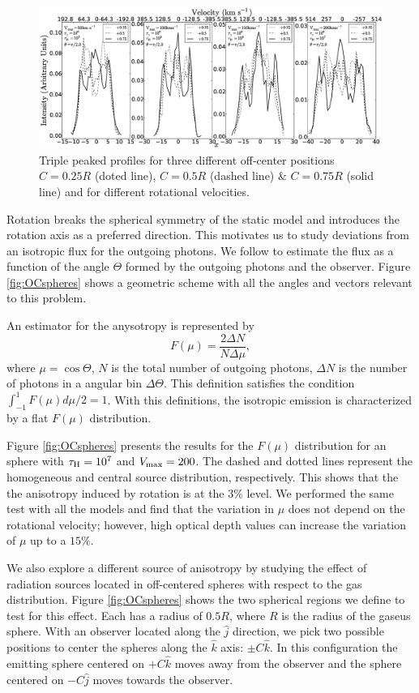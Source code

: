 \documentclass{emulateapj}
\newcommand{\kms}{{\ifmmode{{\mathrm{\,km\ s}^{-1}}}\else{\,km~s$^{-1}$}\fi}}
\begin{document}
\begin{figure}
\includegraphics[scale=0.3]{f11.eps}
\caption{Triple peaked profiles for three different off-center positions
  $C=0.25R$ (doted line), $C=0.5R$ (dashed line) \& $C=0.75R$ (solid
  line) and for different rotational velocities.  
   \label{fig:3p_profiles}} 
\end{figure}


Rotation breaks the spherical symmetry of the static model and
introduces the rotation axis as a preferred direction. This motivates
us to study deviations from an isotropic flux for the outgoing
photons. We follow \cite{Zheng2013} to estimate the flux as a function
of the angle $\Theta$ formed by the outgoing photons and the observer. Figure
\ref{fig:OCspheres} shows a geometric scheme with all the angles and
vectors relevant to this problem.

An estimator for the anysotropy is represented by
%
\begin{equation}
F(\mu) = \frac{2\Delta N}{N\Delta \mu}, 
\end{equation} 
%
where $\mu=\cos\Theta$, $N$ is the total number of outgoing photons,
$\Delta N$ is the number of photons in a angular bin $\Delta
\Theta$. This definition satisfies the condition
$\int_{-1}^{1}F(\mu)d\mu/2=1$.  With this definitions, the isotropic
emission is characterized by a flat $F(\mu)$ distribution. 


Figure \ref{fig:OCspheres} presents the results for the $F(\mu)$
distribution for an sphere with $\tau_{\rm H}=10^{7}$ and $V_{\rm
  max}=200$\kms. The dashed and dotted lines represent the homogeneous
and central source distribution, respectively. This shows that the
the  anisotropy induced by rotation is at the $3\%$ level. We
performed the same test with all the models and find that the
variation in $\mu$ does not depend on the rotational velocity;
however, high optical depth values can increase the variation of
$\mu$ up to a $15\%$. 

We also explore a different source of anisotropy by studying the effect
of radiation sources located in off-centered spheres with respect to
the gas distribution. Figure \ref{fig:OCspheres} shows the two
spherical regions we define to test for this effect. Each has a radius
of $0.5R$, where $R$ is the radius of the gaseus sphere. With an
observer located along the $\hat{j}$ direction, we pick two possible
positions to center the spheres along the $\hat{k}$ axis: $\pm C\hat{k}$. In
this configuration the emitting sphere centered on $+C\hat{k}$ moves
away from the observer and the sphere centered on $-C\hat{j}$ moves
towards the observer. 
\end{document}
